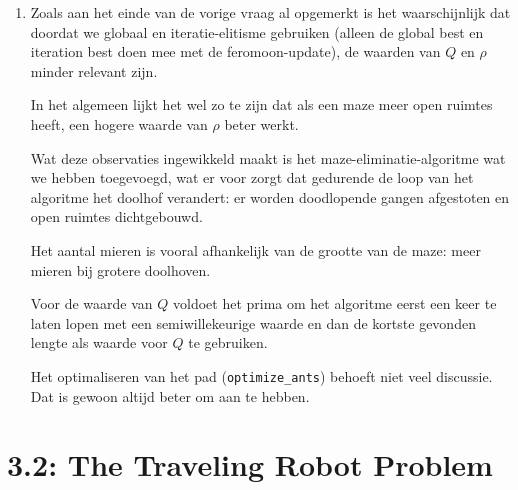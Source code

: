 \documentclass[a4paper,10pt,fleqn]{article}
\begin{document}
\begin{enumerate}[1.]
    \item Zoals aan het einde van de vorige vraag al opgemerkt is het waarschijnlijk dat doordat we globaal en iteratie-elitisme gebruiken (alleen de global best en iteration best doen mee met de feromoon-update), de waarden van $Q$ en $\rho$ minder relevant zijn.

    In het algemeen lijkt het wel zo te zijn dat als een maze meer open ruimtes heeft, een hogere waarde van $\rho$ beter werkt.

    Wat deze observaties ingewikkeld maakt is het maze-eliminatie-algoritme wat we hebben toegevoegd, wat er voor zorgt dat gedurende de loop van het algoritme het doolhof verandert: er worden doodlopende gangen afgestoten en open ruimtes dichtgebouwd.

    Het aantal mieren is vooral afhankelijk van de grootte van de maze: meer mieren bij grotere doolhoven.

    Voor de waarde van $Q$ voldoet het prima om het algoritme eerst een keer te laten lopen met een semiwillekeurige waarde en dan de kortste gevonden lengte als waarde voor $Q$ te gebruiken.

    Het optimaliseren van het pad (\verb|optimize_ants|) behoeft niet veel discussie. Dat is gewoon altijd beter om aan te hebben.

\end{enumerate}

\section*{3.2: The Traveling Robot Problem}
\end{document}

